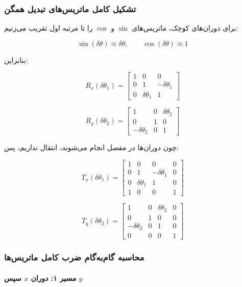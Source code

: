 \documentclass{article}
\begin{document}
\subsubsection{تشکیل کامل ماتریس‌های تبدیل همگن}

برای دوران‌های کوچک، ماتریس‌های $\sin$ و $\cos$ را تا مرتبه اول تقریب می‌زنیم:

\[
\sin(\delta\theta)\approx \delta\theta,
\qquad
\cos(\delta\theta)\approx 1
\]

بنابراین:

\[
R_x(\delta\theta_1)=
\begin{bmatrix}
	1 & 0 & 0\\
	0 & 1 & -\delta\theta_1\\
	0 & \delta\theta_1 & 1
\end{bmatrix}
\]

\[
R_y(\delta\theta_2)=
\begin{bmatrix}
	1 & 0 & \delta\theta_2\\
	0 & 1 & 0\\
	-\delta\theta_2 & 0 & 1
\end{bmatrix}
\]

چون دوران‌ها در مفصل انجام می‌شوند، انتقال نداریم، پس:

\[
T_x(\delta\theta_1)=
\begin{bmatrix}
	1 & 0 & 0 & 0\\
	0 & 1 & -\delta\theta_1 & 0\\
	0 & \delta\theta_1 & 1 & 0\\
	1 & 0 & 0 & 1
\end{bmatrix}
\]

\[
T_y(\delta\theta_2)=
\begin{bmatrix}
	1 & 0 & \delta\theta_2 & 0\\
	0 & 1 & 0 & 0\\
	-\delta\theta_2 & 0 & 1 & 0\\
	0 & 0 & 0 & 1
\end{bmatrix}
\]

\subsubsection{محاسبه گام‌به‌گام ضرب کامل ماتریس‌ها}

\paragraph{مسیر ۱: دوران $x$ سپس $y$}
\end{document}
